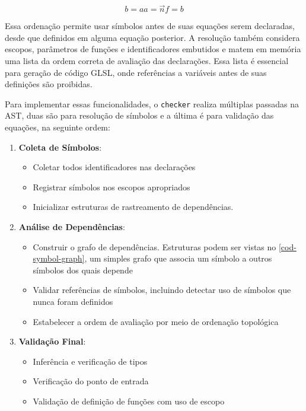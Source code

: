 \begin{subequations} \label{eq-preref}
\begin{equation}
    b = a
\end{equation}
\begin{equation}
    a = \vec{n}
\end{equation}
\begin{equation}
    f = b
\end{equation}
\end{subequations}


Essa ordenação permite usar símbolos antes de suas equações serem declaradas, desde que definidos em alguma equação posterior. A resolução também considera escopos, parâmetros de funções e identificadores embutidos e matem em memória uma lista da ordem correta de avaliação das declarações. Essa lista é essencial para geração de código GLSL, onde referências a variáveis antes de suas definições são proibidas. 

Para implementar essas funcionalidades, o \texttt{checker} realiza múltiplas passadas na AST, duas são para resolução de símbolos e a última é para validação das equações, na seguinte ordem:

\begin{enumerate}
    \item \textbf{Coleta de Símbolos}:
    \begin{itemize}
        \item Coletar todos identificadores nas declarações
        \item Registrar símbolos nos escopos apropriados
        \item Inicializar estruturas de rastreamento de dependências.     \end{itemize}

    \item \textbf{Análise de Dependências}:
    \begin{itemize}
        \item Construir o grafo de dependências. Estruturas podem ser vistas no \autoref{cod-symbol-graph}, um simples grafo que associa um símbolo a outros símbolos dos quais depende
        \item Validar referências de símbolos, incluindo detectar uso de símbolos que nunca foram definidos
        \item Estabelecer a ordem de avaliação por meio de ordenação topológica
    \end{itemize}

    \item \textbf{Validação Final}:
    \begin{itemize}
        \item Inferência e verificação de tipos
        \item Verificação do ponto de entrada
        \item Validação de definição de funções com uso de escopo
    \end{itemize}
\end{enumerate}

